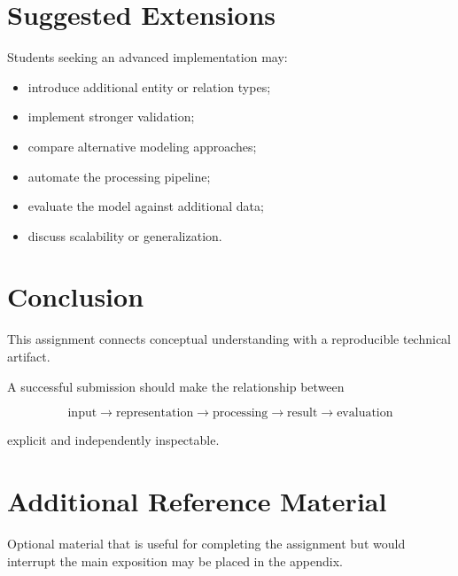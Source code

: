 \documentclass[11pt]{article}
\begin{document}
\section{Suggested Extensions}

Students seeking an advanced implementation may:

\begin{itemize}
    \item introduce additional entity or relation types;
    \item implement stronger validation;
    \item compare alternative modeling approaches;
    \item automate the processing pipeline;
    \item evaluate the model against additional data;
    \item discuss scalability or generalization.
\end{itemize}

\section{Conclusion}

This assignment connects conceptual understanding with a reproducible technical
artifact.

A successful submission should make the relationship between

\[
\text{input}
\rightarrow
\text{representation}
\rightarrow
\text{processing}
\rightarrow
\text{result}
\rightarrow
\text{evaluation}
\]

explicit and independently inspectable.


\appendix

\section{Additional Reference Material}

Optional material that is useful for completing the assignment but would
interrupt the main exposition may be placed in the appendix.
\end{document}
